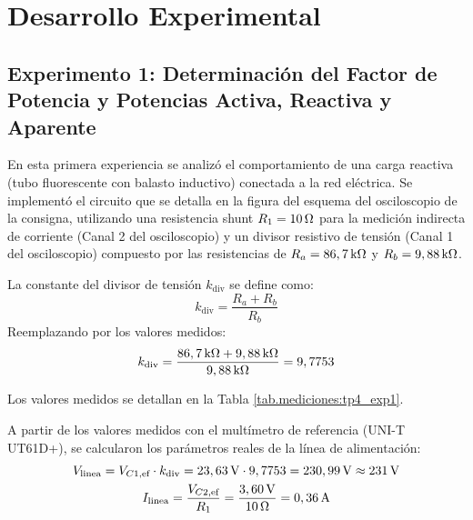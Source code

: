 \chapter{Desarrollo Experimental}

\section{Experimento 1: Determinación del Factor de Potencia y Potencias Activa, Reactiva y Aparente}
En esta primera experiencia se analizó el comportamiento de una carga reactiva (tubo fluorescente con balasto inductivo)
conectada a la red eléctrica. Se implementó el circuito que se detalla en la figura del esquema del osciloscopio de la
consigna, utilizando una resistencia shunt $R_1 = 10\ohm$ para la medición indirecta de corriente (Canal 2 del
osciloscopio) y un divisor resistivo de tensión (Canal 1 del osciloscopio) compuesto por las resistencias de
$R_a = 86,7\kohm$ y $R_b = 9,88\kohm$.

La constante del divisor de tensión $k_{\text{div}}$ se define como:
\begin{equation}
    k_{\text{div}} = \frac{R_a + R_b}{R_b}
\end{equation}
Reemplazando por los valores medidos:
\[ k_{\text{div}} = \frac{86,7\kohm + 9,88\kohm}{9,88\kohm} = 9,7753 \]

Los valores medidos se detallan en la Tabla \ref{tab.mediciones:tp4_exp1}.

\begin{table}[!ht]
    \centering
    \caption{Mediciones obtenidas en el Canal 1 y Canal 2 del osciloscopio y multímetro.}
    \label{tab.mediciones:tp4_exp1}
\end{table}

A partir de los valores medidos con el multímetro de referencia (UNI-T UT61D+), se calcularon los parámetros reales de
la línea de alimentación:
\begin{gather*}
    V_{\text{linea}} = V_{C1,\text{ef}} \cdot k_{\text{div}} = 23,63\V \cdot 9,7753 = 230,99\V \approx 231\V \\
    I_{\text{linea}} = \frac{V_{C2,\text{ef}}}{R_1} = \frac{3,60\V}{10\ohm} = 0,36\A
\end{gather*}

